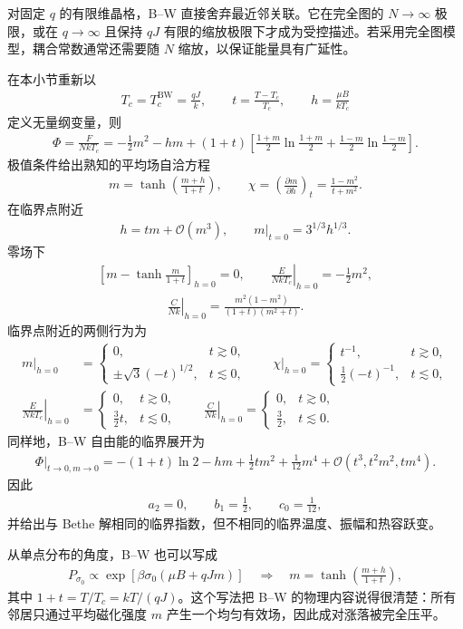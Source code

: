 对固定 \(q\) 的有限维晶格，B--W 直接舍弃最近邻关联。它在完全图的 \(N\to\infty\) 极限，或在 \(q\to\infty\) 且保持 \(qJ\) 有限的缩放极限下才成为受控描述。若采用完全图模型，耦合常数通常还需要随 \(N\) 缩放，以保证能量具有广延性。

在本小节重新以
\begin{align*}
	T_c=T_c^{\mathrm{BW}}=\frac{qJ}{k},\qquad
	t=\frac{T-T_c}{T_c},\qquad
	h=\frac{\mu B}{kT_c}
\end{align*}
定义无量纲变量，则
\begin{align*}
\Phi=\frac F{NkT_c}
=-\frac12m^2-hm
+(1+t)\left[
\frac{1+m}{2}\ln\frac{1+m}{2}
+\frac{1-m}{2}\ln\frac{1-m}{2}
\right].
\end{align*}
极值条件给出熟知的平均场自洽方程
\begin{align*}
m=\tanh\left(\frac{m+h}{1+t}\right),
\qquad
\chi=\left(\frac{\partial m}{\partial h}\right)_t
=\frac{1-m^2}{t+m^2}.
\end{align*}
在临界点附近
\begin{align*}
h=tm+\mathcal O(m^3),\qquad
\left.m\right|_{t=0}=3^{1/3}h^{1/3}.
\end{align*}
零场下
\begin{align*}
\left[
m-\tanh\frac m{1+t}
\right]_{h=0}=0,
\qquad
\left.\frac E{NkT_c}\right|_{h=0}=-\frac12m^2,
\end{align*}
\begin{align*}
\left.\frac C{Nk}\right|_{h=0}
=\frac{m^2(1-m^2)}
{(1+t)(m^2+t)}.
\end{align*}
临界点附近的两侧行为为
\begin{align*}
\left.m\right|_{h=0}
&=
\begin{cases}
0,&t\gtrsim0,\\
\pm\sqrt3(-t)^{1/2},&t\lesssim0,
\end{cases}
\qquad
\left.\chi\right|_{h=0}
=
\begin{cases}
t^{-1},&t\gtrsim0,\\
\frac12(-t)^{-1},&t\lesssim0,
\end{cases}\\
\left.\frac E{NkT_c}\right|_{h=0}
&=
\begin{cases}
0,&t\gtrsim0,\\
\frac32t,&t\lesssim0,
\end{cases}
\qquad
\left.\frac C{Nk}\right|_{h=0}
=
\begin{cases}
0,&t\gtrsim0,\\
\frac32,&t\lesssim0.
\end{cases}
\end{align*}
同样地，B--W 自由能的临界展开为
\begin{align*}
\left.\Phi\right|_{t\to0,m\to0}
=-(1+t)\ln2-hm+\frac12tm^2+\frac1{12}m^4
+\mathcal O(t^3,t^2m^2,tm^4).
\end{align*}
因此
\begin{align*}
a_2=0,\qquad b_1=\frac12,\qquad c_0=\frac1{12},
\end{align*}
并给出与 Bethe 解相同的临界指数，但不相同的临界温度、振幅和热容跃变。

从单点分布的角度，B--W 也可以写成
\begin{align*}
	P_{\sigma_0}\propto
	\exp\left[\beta\sigma_0(\mu B+qJm)\right]
\quad\Longrightarrow\quad
m=\tanh\left(\frac{m+h}{1+t}\right),
\end{align*}
其中 \(1+t=T/T_c=kT/(qJ)\)。这个写法把 B--W 的物理内容说得很清楚：所有邻居只通过平均磁化强度 \(m\) 产生一个均匀有效场，因此成对涨落被完全压平。
